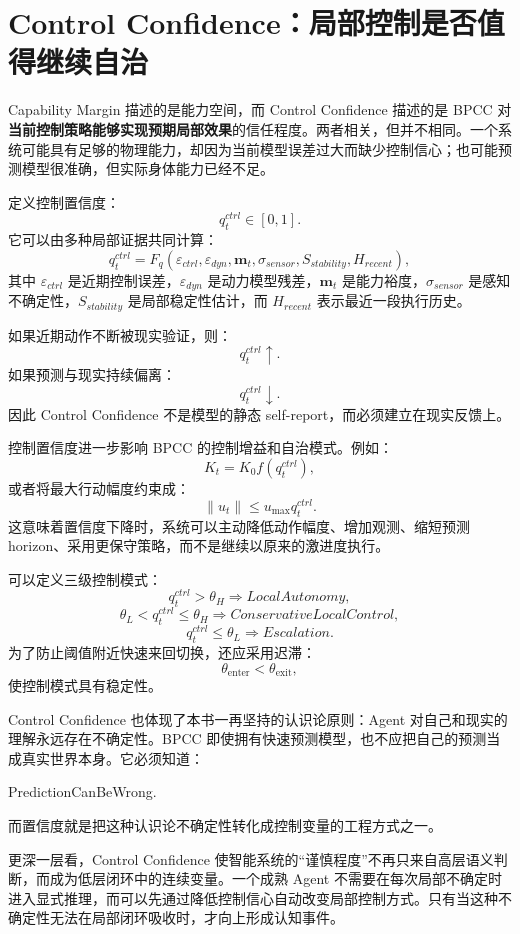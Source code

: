 \section{Control Confidence：局部控制是否值得继续自治}

Capability Margin 描述的是能力空间，而 Control Confidence 描述的是 BPCC 对\textbf{当前控制策略能够实现预期局部效果}的信任程度。两者相关，但并不相同。一个系统可能具有足够的物理能力，却因为当前模型误差过大而缺少控制信心；也可能预测模型很准确，但实际身体能力已经不足。

定义控制置信度：
\[
q_t^{ctrl}\in[0,1].
\]
它可以由多种局部证据共同计算：
\[
q_t^{ctrl}
=
F_q
\left(
\varepsilon_{ctrl},
\varepsilon_{dyn},
\mathbf m_t,
\sigma_{sensor},
S_{stability},
H_{recent}
\right),
\]
其中 $\varepsilon_{ctrl}$ 是近期控制误差，$\varepsilon_{dyn}$ 是动力模型残差，$\mathbf m_t$ 是能力裕度，$\sigma_{sensor}$ 是感知不确定性，$S_{stability}$ 是局部稳定性估计，而 $H_{recent}$ 表示最近一段执行历史。

如果近期动作不断被现实验证，则：
\[
q_t^{ctrl}\uparrow.
\]
如果预测与现实持续偏离：
\[
q_t^{ctrl}\downarrow.
\]
因此 Control Confidence 不是模型的静态 self-report，而必须建立在现实反馈上。

控制置信度进一步影响 BPCC 的控制增益和自治模式。例如：
\[
K_t
=
K_0
f(q_t^{ctrl}),
\]
或者将最大行动幅度约束成：
\[
\|u_t\|
\leq
u_{\max}
q_t^{ctrl}.
\]
这意味着置信度下降时，系统可以主动降低动作幅度、增加观测、缩短预测 horizon、采用更保守策略，而不是继续以原来的激进度执行。

可以定义三级控制模式：
\[
q_t^{ctrl}>\theta_H
\Rightarrow
LocalAutonomy,
\]
\[
\theta_L<q_t^{ctrl}\leq\theta_H
\Rightarrow
ConservativeLocalControl,
\]
\[
q_t^{ctrl}\leq\theta_L
\Rightarrow
Escalation.
\]
为了防止阈值附近快速来回切换，还应采用迟滞：
\[
\theta_{\mathrm{enter}}
<
\theta_{\mathrm{exit}},
\]
使控制模式具有稳定性。

Control Confidence 也体现了本书一再坚持的认识论原则：Agent 对自己和现实的理解永远存在不确定性。BPCC 即使拥有快速预测模型，也不应把自己的预测当成真实世界本身。它必须知道：
\begin{statementbox}
PredictionCanBeWrong.
\end{statementbox}
而置信度就是把这种认识论不确定性转化成控制变量的工程方式之一。

更深一层看，Control Confidence 使智能系统的“谨慎程度”不再只来自高层语义判断，而成为低层闭环中的连续变量。一个成熟 Agent 不需要在每次局部不确定时进入显式推理，而可以先通过降低控制信心自动改变局部控制方式。只有当这种不确定性无法在局部闭环吸收时，才向上形成认知事件。

